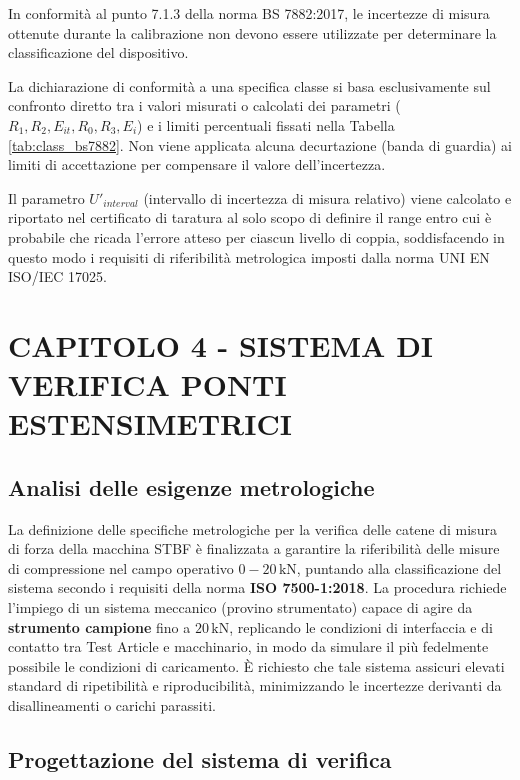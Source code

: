 \documentclass[a4paper, twoside]{article}
\begin{document}
In conformità al punto 7.1.3 della norma BS 7882:2017, le incertezze di misura ottenute durante la calibrazione non devono essere utilizzate per determinare la classificazione del dispositivo.

La dichiarazione di conformità a una specifica classe si basa esclusivamente sul confronto diretto tra i valori misurati o calcolati dei parametri ($R_1, R_2, E_{it}, R_0, R_3, E_i$) e i limiti percentuali fissati nella Tabella \ref{tab:class_bs7882}. Non viene applicata alcuna decurtazione (banda di guardia) ai limiti di accettazione per compensare il valore dell'incertezza.

Il parametro $U'_{interval}$ (intervallo di incertezza di misura relativo) viene calcolato e riportato nel certificato di taratura al solo scopo di definire il range entro cui è probabile che ricada l'errore atteso per ciascun livello di coppia, soddisfacendo in questo modo i requisiti di riferibilità metrologica imposti dalla norma UNI EN ISO/IEC 17025.   

    \newpage

\section{CAPITOLO 4 - SISTEMA DI VERIFICA PONTI ESTENSIMETRICI}

\subsection{Analisi delle esigenze metrologiche}

La definizione delle specifiche metrologiche per la verifica delle catene di misura di forza della macchina STBF è finalizzata a garantire la riferibilità delle misure di compressione nel campo operativo $0-20\,\text{kN}$, puntando alla classificazione del sistema secondo i requisiti della norma \textbf{ISO 7500-1:2018}. La procedura richiede l'impiego di un sistema meccanico (provino strumentato) capace di agire da \textbf{strumento campione} fino a $20\,\text{kN}$, replicando le condizioni di interfaccia e di contatto tra Test Article e macchinario, in modo da simulare il più fedelmente possibile le condizioni di caricamento. È richiesto che tale sistema assicuri elevati standard di ripetibilità e riproducibilità, minimizzando le incertezze derivanti da disallineamenti o carichi parassiti.


\subsection{Progettazione del sistema di verifica}
\end{document}
